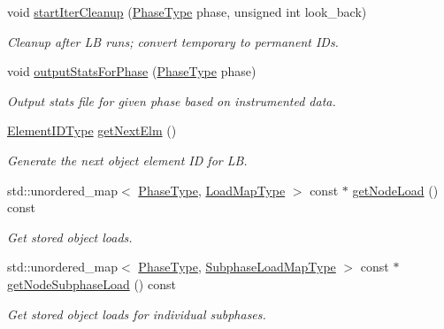 \begin{DoxyCompactItemize}
void \hyperlink{structvt_1_1vrt_1_1collection_1_1balance_1_1_node_stats_ae76790d41701769b86ef15e4924d661d}{start\+Iter\+Cleanup} (\hyperlink{namespacevt_a46ce6733d5cdbd735d561b7b4029f6d7}{Phase\+Type} phase, unsigned int look\+\_\+back)
\begin{DoxyCompactList}\small\item\em Cleanup after LB runs; convert temporary to permanent I\+Ds. \end{DoxyCompactList}\item 
void \hyperlink{structvt_1_1vrt_1_1collection_1_1balance_1_1_node_stats_aa6e33fd5ae9275515557ada40ef3d489}{output\+Stats\+For\+Phase} (\hyperlink{namespacevt_a46ce6733d5cdbd735d561b7b4029f6d7}{Phase\+Type} phase)
\begin{DoxyCompactList}\small\item\em Output stats file for given phase based on instrumented data. \end{DoxyCompactList}\item 
\hyperlink{namespacevt_1_1vrt_1_1collection_1_1balance_a14c8d2c972f2913aa3f1636e5be0a120}{Element\+I\+D\+Type} \hyperlink{structvt_1_1vrt_1_1collection_1_1balance_1_1_node_stats_ac1b800713117d8f017746985a66dfbd2}{get\+Next\+Elm} ()
\begin{DoxyCompactList}\small\item\em Generate the next object element ID for LB. \end{DoxyCompactList}\item 
std\+::unordered\+\_\+map$<$ \hyperlink{namespacevt_a46ce6733d5cdbd735d561b7b4029f6d7}{Phase\+Type}, \hyperlink{namespacevt_1_1vrt_1_1collection_1_1balance_a45306ee4bf38fe3fb586d1ee2fa3d147}{Load\+Map\+Type} $>$ const  $\ast$ \hyperlink{structvt_1_1vrt_1_1collection_1_1balance_1_1_node_stats_a5b34d26f9e10f7ff3ceb92b95f0ed2f6}{get\+Node\+Load} () const
\begin{DoxyCompactList}\small\item\em Get stored object loads. \end{DoxyCompactList}\item 
std\+::unordered\+\_\+map$<$ \hyperlink{namespacevt_a46ce6733d5cdbd735d561b7b4029f6d7}{Phase\+Type}, \hyperlink{namespacevt_1_1vrt_1_1collection_1_1balance_a3d91523158c1025b7b665240072f3b7e}{Subphase\+Load\+Map\+Type} $>$ const  $\ast$ \hyperlink{structvt_1_1vrt_1_1collection_1_1balance_1_1_node_stats_a24660f52ff5e6a734a443ebbd1852519}{get\+Node\+Subphase\+Load} () const
\begin{DoxyCompactList}\small\item\em Get stored object loads for individual subphases. \end{DoxyCompactList}\item 

\end{DoxyCompactItemize}

